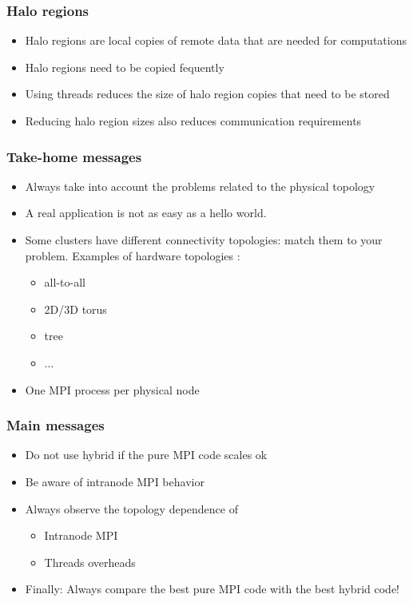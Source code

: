 \begin{frame}
\frametitle{Halo regions}
\begin{itemize}
\item  Halo regions are local copies of remote data that are needed for computations
\item  Halo regions need to be copied fequently
\item  Using threads reduces the size of halo region copies that need to be stored
\item  Reducing halo region sizes also reduces communication requirements
\end{itemize}
\end{frame}



\begin{frame}
\frametitle{Take-home messages}
\begin{itemize}
\item Always take into account the problems related to the physical topology
\item A real application is not as easy as a hello world.
\item Some clusters have different connectivity topologies: match them to your problem. Examples of hardware topologies :
\begin{itemize}
\item all-to-all
\item 2D/3D torus
\item tree
\item ...
\end{itemize}
        \item One MPI process per physical node 
\end{itemize}
\end{frame}





\begin{frame}[fragile]
\frametitle{Main messages}
\begin{itemize}
\item Do not use hybrid if the pure MPI code scales ok
\item Be aware of intranode MPI behavior
\item Always observe the topology dependence of
\begin{itemize}
   \item Intranode MPI
   \item Threads overheads
\end{itemize}
\item Finally: Always compare the best pure MPI code with the best hybrid code!
\end{itemize}

\end{frame}


